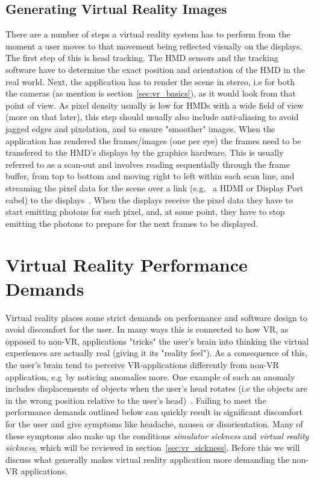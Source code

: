 \subsection{Generating Virtual Reality Images}
There are a number of steps a virtual reality system has to perform from the moment a user moves to that movement being reflected visually on the displays.
The first step of this is head tracking. The HMD sensors and the tracking software have to determine the exact position and orientation of the HMD in the 
real world. Next, the application has to render the scene in stereo, i.e for both the cameras (as mention is section~\vref{sec:vr_basics}), 
as it would look from that point of view. As pixel density usually is low for HMDs with a wide field of view (more on that later), this step should usually 
also include anti-aliasing to avoid jagged edges and pixelation, and to ensure "smoother" images. When the application has rendered the frames/images (one per eye)
the frames need to be transfered to the HMD's displays by the graphics hardware. This is usually referred to as a scan-out and involves reading sequentially through the 
frame buffer, from top to bottom and moving right to left within each scan line, and streaming the pixel data for the scene over a link (e.g.~ a HDMI or Display Port cabel) 
to the displays~\citep{Abrash2012}. When the displays receive the pixel data they have to start emitting photons for each pixel, and, at some point, they 
have to stop emitting the photons to prepare for the next frames to be displayed. 


\section{Virtual Reality Performance Demands}
Virtual reality places some strict demands on performance and software design to avoid discomfort for the user. In many ways this is connected to how VR, 
as opposed to non-VR, applications "tricks" the user's brain into thinking the virtual experiences are actually real (giving it its "reality feel"). 
As a consequence of this, the user's brain tend to perceive VR-applications differently from non-VR application, e.g~by noticing anomalies more. 
One example of such an anomaly includes displacements of objects when the user's head rotates (i.e the objects are in the wrong position 
relative to the user's head)~\citep{Abrash2012}. 
Failing to meet the performance demands outlined below can quickly result in significant discomfort for the user and give symptoms like 
headache, nausea or disorientation. Many of these symptoms also make up the conditions \textit{simulator sickness} and \textit{virtual reality sickness},
which will be reviewed in section~\vref{sec:vr_sickness}.  
Before this we will discuss what generally makes virtual reality application more demanding the non-VR applications.


